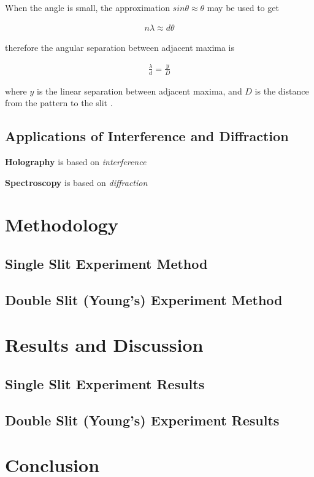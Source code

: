 \documentclass[12pt]{article}
\begin{document}
When the angle is small, the approximation $sin \theta \approx \theta$ may be used to get

\vspace{-2ex}
\begin{gather}
    n \lambda \approx d \theta
\end{gather}

therefore the angular separation between adjacent maxima is

\vspace{-2ex}
\begin{gather}
    \frac{\lambda}{d} = \frac{y}{D}
\end{gather}

where $y$ is the linear separation between adjacent maxima, and $D$ is the distance from the pattern to the slit \cite{UCDinterference}.

\subsection{Applications of Interference and Diffraction}

\textbf{Holography} is based on \textit{interference}

\textbf{Spectroscopy} is based on \textit{diffraction}

\section{Methodology} \label{sec:2}

\subsection{Single Slit Experiment Method} \label{sec:2.1}



\subsection{Double Slit (Young's) Experiment Method} \label{sec:2.2}




\section{Results and Discussion} \label{sec:3}

\subsection{Single Slit Experiment Results}



\subsection{Double Slit (Young's) Experiment Results}



\section{Conclusion} \label{sec:4}



\newpage



 \label{sec:ref}

\vspace{1.5cm}

\listoffigures
\end{document}
